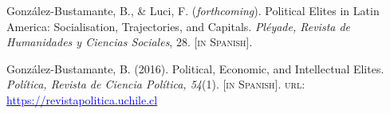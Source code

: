 





\begin{publications}

\begin{benumerate}{2}

\item{\small Gonz\'alez-Bustamante, B., \& Luci, F. ({\itshape forthcoming}). Political Elites in Latin America: Socialisation, Trajectories, and Capitals. {\itshape Pl\'eyade, Revista de Humanidades y Ciencias Sociales}, 28. {\footnotesize \scshape [in Spanish]}.}\vspace{1mm}

\item{\small Gonz\'alez-Bustamante, B. (2016). Political, Economic, and Intellectual Elites. {\itshape Pol\'itica, Revista de Ciencia Pol\'itica, 54}(1). {\footnotesize \scshape [in Spanish]}. {\scshape url}: \href{https://revistapolitica.uchile.cl/index.php/RP/issue/view/4365}{\textcolor{blue}{https://revistapolitica.uchile.cl}}}\vspace{1mm}

\end{benumerate}

\end{publications}
